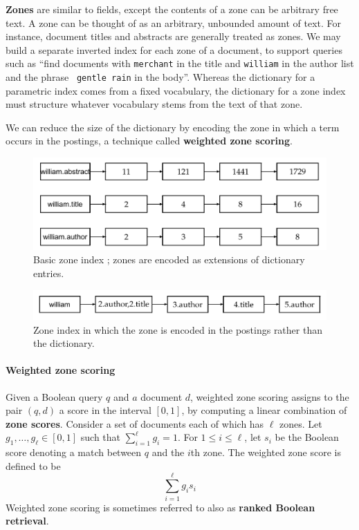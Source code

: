 \documentclass[letterpaper,11pt]{article}
\newcommand{\code}[1]{\texttt{#1}}
\begin{document}
\textbf{Zones} are similar to fields, except the contents of a zone can be arbitrary
free text. A zone can be thought of as an arbitrary, unbounded amount of text. For instance, document titles and abstracts are generally treated as zones. We may build a separate inverted index for each zone of a document, to support queries such as “find documents with \code{merchant} in the title and \code{william} in the author list and the phrase \code{ gentle rain} in the body”. Whereas the dictionary for a parametric index comes from a fixed vocabulary, the dictionary for a zone index must structure whatever vocabulary stems from the text of that zone.

We can reduce the size of the dictionary by encoding the zone in which a term occurs in the postings, a technique called \textbf{weighted zone scoring}.
\begin{figure}[H]
    \centering
    \includegraphics[scale=0.50]{sect6/figure_6_2.png}
    \caption{Basic zone index ; zones are encoded as extensions of dictionary entries.}
\end{figure}
\begin{figure}[H]
    \centering
    \includegraphics[scale=0.50]{sect6/figure_6_3.png}
    \caption{Zone index in which the zone is encoded in the postings rather than the dictionary.}
\end{figure}

\paragraph{Weighted zone scoring}
Given a Boolean query $q$ and $a$ document $d$, weighted zone scoring assigns to the pair $(q, d)$ a score in the interval $[0, 1]$, by computing a linear combination of \textbf{zone scores}. Consider a set of documents each of which has $\ell$ zones. Let $g_1,\dots,g_\ell \in [0,1]$ such that $\sum_{i=1}^{\ell}g_i=1$. For $1\leq i \leq \ell$, let $s_i$ be the Boolean score denoting a match between $q$ and the $i$th zone. The weighted zone score is defined to be
\[
\sum_{i=1}^{\ell}g_is_i
\]
Weighted zone scoring is sometimes referred to also as \textbf{ranked Boolean retrieval}.
\end{document}
